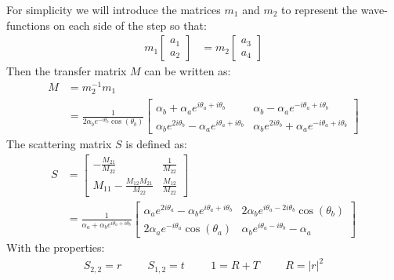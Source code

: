 		For simplicity we will introduce the matrices $m_{1}$ and $m_{2}$ to represent the wave-functions on each side of the step so that:
		\begin{align}
			m_{1}\left[\begin{array}{ccc}
				a_{1}\\
				a_{2}
			\end{array}\right]
			&=
			m_{2}\left[\begin{array}{ccc}
				a_{3}\\
				a_{4}
			\end{array}\right]
		\end{align}
		Then the transfer matrix $M$ can be written as:
		\begin{align}
			M&=m_{2}^{-1}m_{1}\\
			&=
			\frac{1}{2\alpha_{b}e^{-i\theta_{b}}\cos(\theta_{b})}\left[\begin{array}{ccc}
				\alpha_{b}+\alpha_{a}e^{i\theta_{a}+i\theta_{b}}&\alpha_{b}-\alpha_{a}e^{-i\theta_{a}+i\theta_{b}}\\
				\alpha_{b}e^{2i\theta_{b}}-\alpha_{a}e^{i\theta_{a}+i\theta_{b}}&\alpha_{b}e^{2i\theta_{b}}+\alpha_{a}e^{-i\theta_{a}+i\theta_{b}}
			\end{array}\right]
		\end{align}
		The scattering matrix $S$ \cite{b18} is defined as:
		\begin{align}
			S&=
			\left[\begin{array}{ccc}
				-\frac{M_{21}}{M_{22}}&\frac{1}{M_{22}}\\
				M_{11}-\frac{M_{12}M_{21}}{M_{22}}&\frac{M_{12}}{M_{22}}
			\end{array}\right]\\
			&=
			\frac{1}{\alpha_{a}+\alpha_{b}e^{i\theta_{a}+i\theta_{b}}}\left[\begin{array}{ccc}
				\alpha_{a}e^{2i\theta_{a}}-\alpha_{b}e^{i\theta_{a}+i\theta_{b}}&2\alpha_{b}e^{i\theta_{a}-2i\theta_{b}}\cos(\theta_{b})\\
				2\alpha_{a}e^{-i\theta_{a}}\cos(\theta_{a})&\alpha_{b}e^{i\theta_{a}-i\theta_{b}}-\alpha_{a}
			\end{array}\right]
		\end{align}
		With the properties:
		\begin{align}
			S_{2,2}=r\hspace{1cm}S_{1,2}=t\hspace{1cm}1=R+T\hspace{1cm}R=|r|^{2}
		\end{align}
